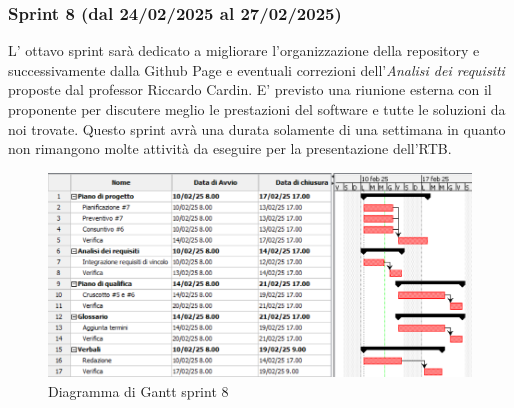 \subsubsection{Sprint 8 (dal 24/02/2025 al 27/02/2025)}
L' ottavo sprint sarà dedicato a migliorare l'organizzazione della repository e successivamente dalla Github Page
 e eventuali correzioni dell'\textit{Analisi dei requisiti} proposte dal professor Riccardo Cardin.
E' previsto una riunione esterna con il proponente per discutere meglio le prestazioni del software e tutte le soluzioni da noi trovate.
Questo sprint avrà una durata solamente di una settimana in quanto non rimangono molte attività da eseguire per la presentazione dell'RTB.

\begin{figure}[h!]
    \centering
    \includegraphics[scale = 0.65]{template/images/gantt7.png}
    \caption{Diagramma di Gantt sprint 8}
    \label{fig:3.8} %
\end{figure}

